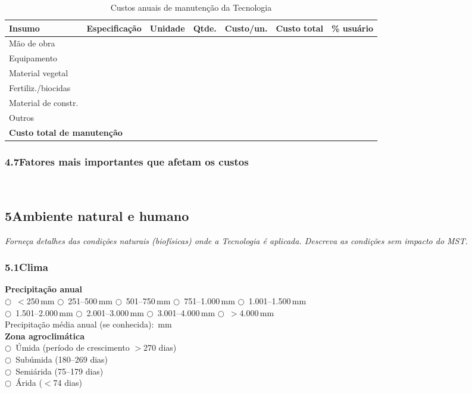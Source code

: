 \begin{table}[htbp]
\centering\small
\caption{Custos anuais de manutenção da Tecnologia}
\label{tab:app_cost_maint}
\begin{tabular}{p{2.8cm}p{2.5cm}lrrrl}
\toprule
\textbf{Insumo} & \textbf{Especificação} & \textbf{Unidade} & \textbf{Qtde.} & \textbf{Custo/un.} & \textbf{Custo total} & \textbf{\% usuário} \\
\midrule
Mão de obra      & & & & & & \\
Equipamento      & & & & & & \\
Material vegetal & & & & & & \\
Fertiliz./biocidas & & & & & & \\
Material de constr. & & & & & & \\
Outros           & & & & & & \\
\midrule
\multicolumn{5}{l}{\textbf{Custo total de manutenção}} & & \\
\bottomrule
\end{tabular}
\end{table}

\subsubsection*{4.7\quad Fatores mais importantes que afetam os custos}
\dotfill\\[2pt]\dotfill

\subsection*{5\quad Ambiente natural e humano}

\textit{Forneça detalhes das condições naturais (biofísicas) onde a Tecnologia é aplicada. Descreva as condições sem impacto do MST.}

\subsubsection*{5.1\quad Clima}

\noindent\textbf{Precipitação anual}\\
$\bigcirc$~$<$250\,mm \quad $\bigcirc$~251--500\,mm \quad $\bigcirc$~501--750\,mm \quad $\bigcirc$~751--1.000\,mm \quad $\bigcirc$~1.001--1.500\,mm\\
$\bigcirc$~1.501--2.000\,mm \quad $\bigcirc$~2.001--3.000\,mm \quad $\bigcirc$~3.001--4.000\,mm \quad $\bigcirc$~$>$4.000\,mm\\[4pt]
Precipitação média anual (se conhecida): \dotfill\,mm\\[4pt]
\textbf{Zona agroclimática}\\
$\bigcirc$~Úmida (período de crescimento $>$270 dias)\\
$\bigcirc$~Subúmida (180--269 dias)\\
$\bigcirc$~Semiárida (75--179 dias)\\
$\bigcirc$~Árida ($<$74 dias)

